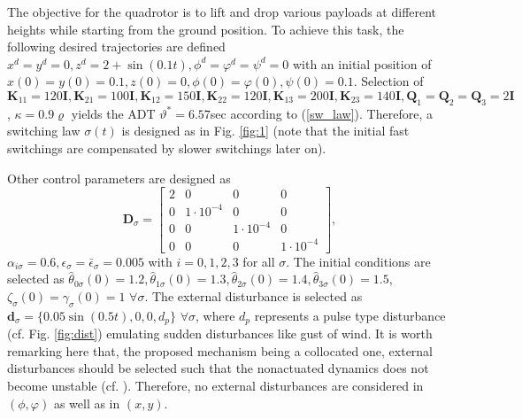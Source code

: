 \documentclass[AMA,STIX1COL,sort, compress]{WileyNJD-v2}
\begin{document}
The objective for the quadrotor is to lift and drop various payloads at different heights while starting from the ground position. To achieve this task, the following desired trajectories are defined $x^d=y^d=0, z^d= 2+\sin(0.1t), \phi^d=\varphi^d=\psi^d=0$ with an initial position of $ x(0)=y(0)=0.1, z(0)= 0, \phi(0)=\varphi(0),\psi(0)=0.1$. %
Selection of $\mathbf K_{11}=120\mathbf{I}, \mathbf K_{21}=100\mathbf I, \mathbf K_{12}=150\mathbf{I}, \mathbf K_{22}=120\mathbf I,     \mathbf K_{13}=200\mathbf{I}, \mathbf K_{23}=140\mathbf I, \mathbf Q_1=\mathbf Q_2=\mathbf Q_3=2\mathbf I$, $\kappa=0.9\varrho$ yields the ADT $\vartheta^{*}=6.57$sec according to (\ref{sw_law}). Therefore, a switching law $\sigma(t)$ is designed as in Fig. \ref{fig:1} (note that the initial fast switchings are compensated by slower switchings later on). %

Other control parameters are designed as $$\mathbf D_\sigma=\begin{bmatrix}
2 & 0  & 0  & 0 \\ 
0& 1\cdot10^{-4}  & 0 & 0\\ 
0 & 0  & 1\cdot10^{-4}  & 0 \\ 
0 & 0  & 0  & 1\cdot10^{-4} 
\end{bmatrix},$$
$\alpha_{i\sigma}=0.6,\epsilon_{\sigma}=\bar{\epsilon}_{\sigma}=0.005 $ with $i=0,1,2,3$ for all $\sigma$. The initial conditions are selected as $\hat{\theta}_{0\sigma}(0)=1.2,\hat{\theta}_{1\sigma}(0)=1.3,\hat{\theta}_{2\sigma}(0)=1.4,\hat{\theta}_{3\sigma}(0)=1.5 $, $\zeta_\sigma(0)=\gamma_{\sigma}(0)=1$ $\forall \sigma$. The external disturbance is selected as $\mathbf{d}_{\sigma}= \lbrace 0.05\sin(0.5t),0,0,d_p \rbrace$ $\forall \sigma$, where $d_p$ represents a pulse type disturbance (cf. Fig. \ref{fig:dist}) emulating sudden disturbances like gust of wind. It is worth remarking here that, the proposed mechanism being a collocated one, external disturbances should be selected such that the nonactuated dynamics does not become unstable (cf. \cite{shkolnik2008high,spong1994partial}). Therefore, no external disturbances are considered in $(\phi,\varphi)$ as well as in $(x,y)$.
\end{document}
